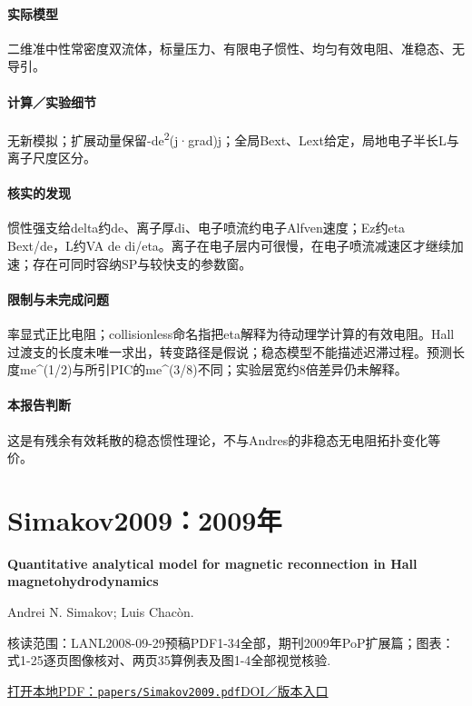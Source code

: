\documentclass[UTF8,a4paper,11pt,openany,fontset=fandol]{ctexbook}
\begin{document}
\paragraph{实际模型}二维准中性常密度双流体，标量压力、有限电子惯性、均匀有效电阻、准稳态、无导引。

\paragraph{计算／实验细节}无新模拟；扩展动量保留-de\textsuperscript{2}(j·grad)j；全局Bext、Lext给定，局地电子半长L与离子尺度区分。

\paragraph{核实的发现}惯性强支给delta约de、离子厚di、电子喷流约电子Alfven速度；Ez约eta Bext/de，L约VA de di/eta。离子在电子层内可很慢，在电子喷流减速区才继续加速；存在可同时容纳SP与较快支的参数窗。

\paragraph{限制与未完成问题}率显式正比电阻；collisionless命名指把eta解释为待动理学计算的有效电阻。Hall过渡支的长度未唯一求出，转变路径是假说；稳态模型不能描述迟滞过程。预测长度me\textasciicircum{}(1/2)与所引PIC的me\textasciicircum{}(3/8)不同；实验层宽约8倍差异仍未解释。

\paragraph{本报告判断}这是有残余有效耗散的稳态惯性理论，不与Andres的非稳态无电阻拓扑变化等价。

\section{Simakov2009：2009年}\label{paper:Simakov2009}

\textbf{Quantitative analytical model for magnetic reconnection in Hall magnetohydrodynamics}\citep{Simakov2009}\

Andrei N. Simakov;  Luis Chacòn.

\textsf{核读范围：}LANL2008-09-29预稿PDF1-34全部，期刊2009年PoP扩展篇；\textsf{图表：}式1-25逐页图像核对、两页35算例表及图1-4全部视觉核验.

\href{run:../papers/Simakov2009.pdf}{打开本地PDF：\texttt{papers/Simakov2009.pdf}}\quad\href{https://doi.org/10.1063/1.3077269}{DOI／版本入口}
\end{document}
